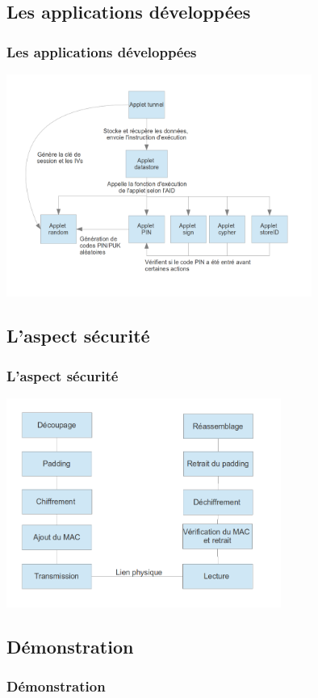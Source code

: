 \documentclass{beamer}
\begin{document}
\subsection{Les applications développées}
\begin{frame}
    \frametitle{Les applications développées}
    \includegraphics[width=10cm]{graphe_dep}
    \begin{block}{}
    \end{block}
\end{frame}

\subsection{L'aspect sécurité}
\begin{frame}
    \frametitle{L'aspect sécurité}
    \includegraphics[width=9cm]{stack}
\end{frame}

\subsection{Démonstration}
\begin{frame}
    \frametitle{Démonstration}
    \begin{block}{}
    \end{block}
\end{frame}
\end{document}
